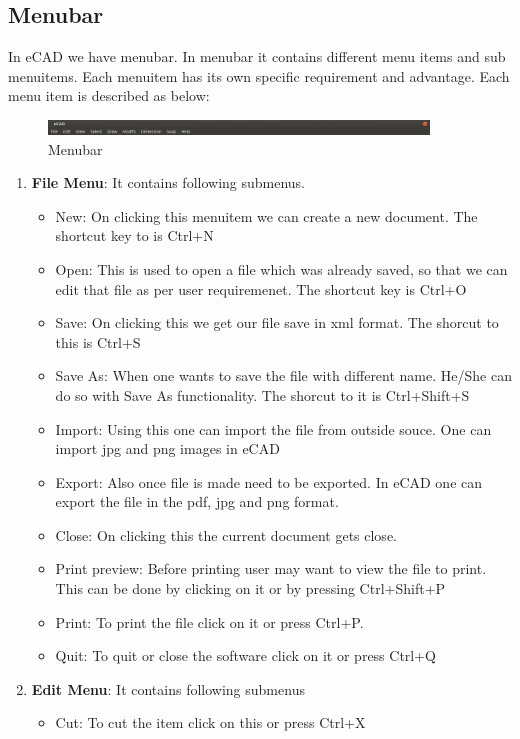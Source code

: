 \subsection{Menubar}
In eCAD we have menubar. In menubar it contains different menu items and sub menuitems. Each menuitem has its own specific requirement and advantage. Each menu item is described as below:
\begin{figure}[h!]
\centering
\includegraphics[width=0.9\textwidth]{images/menubar.png}
\caption{Menubar}
\end{figure}
\begin{enumerate}
\item \textbf{File Menu}: It contains following submenus.
\begin{itemize}
\item New: On clicking this menuitem we can create a new document. The shortcut key to is Ctrl+N
\item Open: This is used to open a file which was already saved, so that we can edit that file as per user requiremenet. The shortcut key is Ctrl+O
\item Save: On clicking this we get our file save in xml format. The shorcut to this is Ctrl+S
\item Save As: When one wants to save the file with different name. He/She can do so with Save As functionality. The shorcut to it is Ctrl+Shift+S
\item Import: Using this one can import the file from outside souce. One can import jpg and png images in eCAD
\item Export: Also once file is made need to be exported. In eCAD one can export the file in the pdf, jpg and png format.
\item Close: On clicking this the current document gets close.
\item Print preview: Before printing user may want to view the file to print. This can be done by clicking on it or by pressing Ctrl+Shift+P 
\item Print: To print the file click on it or press Ctrl+P.
\item Quit: To quit or close the software click on it or press Ctrl+Q
\end{itemize}
\item \textbf{Edit Menu}: It contains following submenus
\begin{itemize}
\item Cut: To cut the item click on this or press Ctrl+X

\end{itemize}
\end{enumerate}
